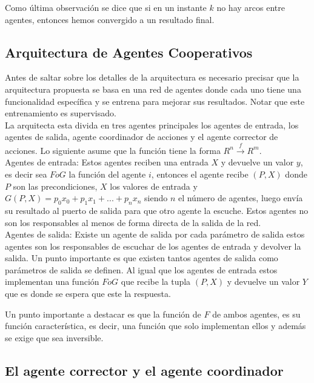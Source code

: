 \documentclass{article}
\begin{document}
        Como última observación se dice que si en un instante $k$ no hay arcos entre agentes, entonces hemos convergido a un resultado final.

    \subsection*{Arquitectura de Agentes Cooperativos}

        Antes de saltar sobre los detalles de la arquitectura es necesario precisar que la arquitectura propuesta se basa en una red de agentes donde cada uno tiene una funcionalidad específica y se entrena para mejorar sus resultados. Notar que este entrenamiento es supervisado. \\

        La arquitecta esta divida en tres agentes principales los agentes de entrada, los agentes de salida, agente coordinador de acciones y el agente corrector de acciones. Lo siguiente asume que la función tiene la forma $R^n \xrightarrow{f} R^m$. \\

        Agentes de entrada: Estos agentes reciben una entrada $X$ y devuelve un valor $y$, es decir sea $FoG$ la función del agente $i$, entonces el agente recibe $(P,X)$ donde $P$ son las precondiciones, $X$ los valores de entrada y
        $G(P,X)=p_0x_0 + p_1x_1 +...+p_nx_n$ siendo $n$ el número de agentes, luego envía su resultado al puerto de salida para que otro agente la escuche. Estos agentes no son los responsables al menos de forma directa de la salida de la red.\\

        Agentes de salida: Existe un agente de salida por cada parámetro de salida estos agentes son los responsables de escuchar de los agentes de entrada y devolver la salida.
        Un punto importante es que existen tantos agentes de salida como parámetros de salida se definen. Al igual que los agentes de entrada estos implementan una función $FoG$ que recibe la tupla $(P,X)$ y devuelve un valor $Y$ que es donde se espera que este la respuesta.

        Un punto importante a destacar es que la función de $F$ de ambos agentes, es su función característica, es decir, una función que solo implementan ellos y además se exige que sea inversible.

        \subsection*{El agente corrector y el agente coordinador}
\end{document}

